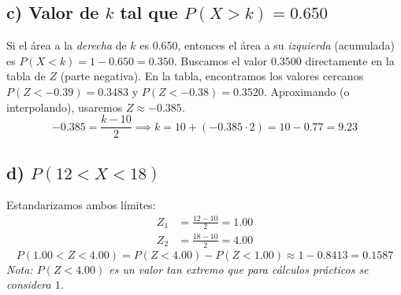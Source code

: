 \documentclass[11pt, a4paper]{article}
\begin{document}
\subsection*{c) Valor de $k$ tal que $P(X > k) = 0.650$}
Si el área a la \textit{derecha} de $k$ es 0.650, entonces el área a su \textit{izquierda} (acumulada) es $P(X < k) = 1 - 0.650 = 0.350$. 
Buscamos el valor $0.3500$ directamente en la tabla de $Z$ (parte negativa).
En la tabla, encontramos los valores cercanos $P(Z < -0.39) = 0.3483$ y $P(Z < -0.38) = 0.3520$. Aproximando (o interpolando), usaremos $Z \approx -0.385$.
\begin{equation*}
-0.385 = \frac{k - 10}{2} \implies k = 10 + (-0.385 \cdot 2) = 10 - 0.77 = 9.23
\end{equation*}
\begin{center}
\end{center}

\subsection*{d) $P(12 < X < 18)$}
Estandarizamos ambos límites:
\begin{align*}
Z_1 &= \frac{12 - 10}{2} = 1.00 \\
Z_2 &= \frac{18 - 10}{2} = 4.00
\end{align*}
\begin{equation*}
P(1.00 < Z < 4.00) = P(Z < 4.00) - P(Z < 1.00) \approx 1 - 0.8413 = 0.1587
\end{equation*}
\textit{Nota: $P(Z < 4.00)$ es un valor tan extremo que para cálculos prácticos se considera $1$.}
\begin{center}
\end{center}
\end{document}
